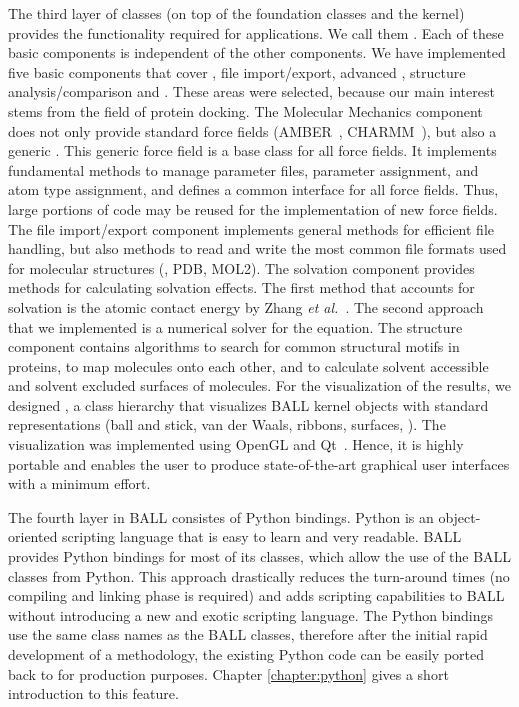 The third layer of classes (on top of the foundation classes and the kernel)
provides the functionality required for applications. We call them
. Each of these basic components is independent of
the other components.  We have implemented five basic components that cover
, file import/export, advanced , structure analysis/comparison and . These
areas were selected, because our main interest stems from the field of protein
docking. The Molecular Mechanics component does not only provide standard
force fields (AMBER~\cite{AMBER95}, CHARMM~\cite{BBO+83}), but also a generic
.  This generic force field is a base class for all force
fields. It implements fundamental methods to manage parameter files, parameter
assignment, and atom type assignment, and defines a common interface for all
force fields. Thus, large portions of code may be reused for the
implementation of new force fields.  The file import/export component
implements general methods for efficient file handling, but also methods to
read and write the most common file formats used for molecular structures
(\eg, PDB, MOL2). The solvation component provides methods for calculating
solvation effects. The first method that accounts for solvation is the atomic
contact energy by Zhang {\it et al.}~\cite{ZVC+97}. The second approach that
we implemented is a numerical solver for the  equation.  The
structure component contains algorithms to search for common structural motifs
in proteins, to map molecules onto each other, and to calculate solvent
accessible and solvent excluded surfaces of molecules. For the visualization
of the results, we designed , a class hierarchy that
visualizes BALL kernel objects with standard representations (ball and stick,
van der Waals, ribbons, surfaces, \etc). The visualization was implemented
using OpenGL and Qt~\cite{QT}. Hence, it is highly portable and enables the
user to produce state-of-the-art graphical user interfaces with a minimum
effort.

The fourth layer in BALL consistes of Python bindings. Python is an
object-oriented scripting language that is easy to learn and very readable.
BALL provides Python bindings for most of its classes, which allow the use of
the BALL \CPP classes from Python. This approach drastically reduces the
turn-around times (no compiling and linking phase is required) and adds
scripting capabilities to BALL without introducing a new and exotic scripting
language. The Python bindings use the same class names as the BALL classes,
therefore after the initial rapid development of a methodology, the existing
Python code can be easily ported back to \CPP for production purposes.
Chapter \ref{chapter:python} gives a short introduction to this feature.
